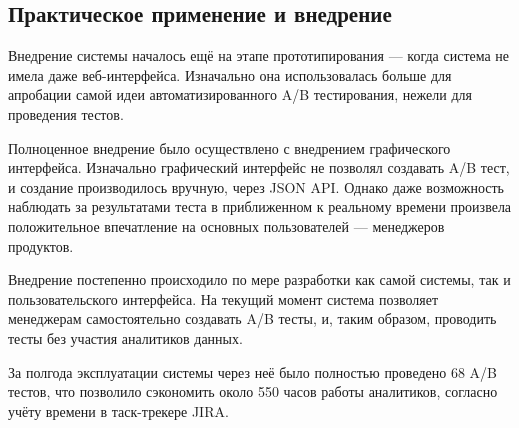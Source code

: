 \documentclass[../document.tex]{subfiles}
\begin{document}
	\subsection{Практическое применение и внедрение}
	\par Внедрение системы началось ещё на этапе прототипирования --- когда система не имела даже веб-интерфейса. Изначально она использовалась больше для апробации самой идеи автоматизированного A/B тестирования, нежели для проведения тестов.
	\par Полноценное внедрение было осуществлено с внедрением графического интерфейса. Изначально графический интерфейс не позволял создавать A/B тест, и создание производилось вручную, через JSON API. Однако даже возможность наблюдать за результатами теста в приближенном к реальному времени произвела положительное впечатление на основных пользователей --- менеджеров продуктов.
	\par Внедрение постепенно происходило по мере разработки как самой системы, так и пользовательского интерфейса. На текущий момент система позволяет менеджерам самостоятельно создавать A/B тесты, и, таким образом, проводить тесты без участия аналитиков данных.
	\par За полгода эксплуатации системы через неё было полностью проведено 68 A/B тестов, что позволило сэкономить около 550 часов работы аналитиков, согласно учёту времени в таск-трекере JIRA.
\end{document}
